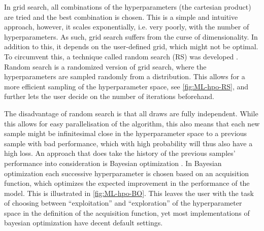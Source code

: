In grid search, all combinations of the hyperparameters (the cartesian product) are tried and the best combination is chosen. This is a simple and intuitive approach, however, it scales exponentially, i.e. very poorly, with the number of hyperparameters. As such, grid search suffers from the curse of dimensionality. In addition to this, it depends on the user-defined grid, which might not be optimal. To circumvent this, a technique called random search (RS) was developed \autocite{bergstraRandomSearchHyperparameter2012a}. Random search is a randomized version of grid search, where the hyperparameters are sampled randomly from a distribution. This allows for a more efficient sampling of the hyperparameter space, see \autoref{fig:ML-hpo-RS}, and further lets the user decide on the number of iterations beforehand.


The disadvantage of random search is that all draws are fully independent. While this allows for easy parallelisation of the algorithm, this also means that each new sample might be infinitesimal close in the hyperparameter space to a previous sample with bad performance, which with high probability will thus also have a high loss. An approach that does take the history of the previous samples' performance into consideration is Bayesian optimization \autocite{brochuTutorialBayesianOptimization2010a}. In Bayesian optimization each successive hyperparameter is chosen based on an acquisition function, which optimizes the expected improvement in the performance of the model. This is illustrated in \autoref{fig:ML-hpo-BO}. This leaves the user with the task of choosing between ``exploitation'' and ``exploration'' of the hyperparameter space in the definition of the acquisition function, yet most implementations of bayesian optimization have decent default settings.

